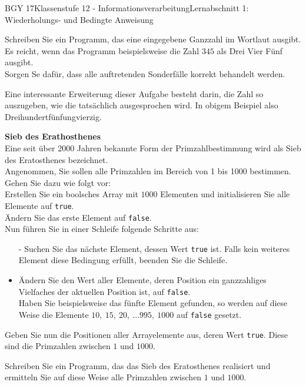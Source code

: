 \documentclass[oneside,openany,headings=optiontotoc,11pt,numbers=noenddot]{scrreprt}
\begin{document}
\begin{worksheet}{BGY 17}{Klassenstufe 12 - Informationsverarbeitung}{Lernabschnitt 1: Wiederholungs- und Bedingte Anweisung}
\begin{framed}
			Schreiben Sie ein Programm, das eine eingegebene Ganzzahl im Wortlaut ausgibt. Es reicht, wenn das Programm beispielsweise die Zahl \(345\) als \grq{}Drei Vier Fünf\grq{} ausgibt.\\
			Sorgen Se dafür, dass alle auftretenden Sonderfälle korrekt behandelt werden.\\
			\par\noindent
			Eine interessante Erweiterung dieser Aufgabe besteht darin, die Zahl so auszugeben, wie die tatsächlich ausgesprochen wird. In obigem Beispiel also \grqq{}Dreihundertfünfungvierzig\grqq{}.\\
			\par\noindent
			\textbf{Sieb des Erathosthenes}\\
			Eine seit über 2000 Jahren bekannte Form der Primzahlbestimmung wird als \grqq{}Sieb des Eratosthenes\grqq{} bezeichnet.\\
			Angenommen, Sie sollen alle Primzahlen im Bereich von 1 bis 1000 bestimmen. Gehen Sie dazu wie folgt vor:\\
			Erstellen Sie ein boolsches Array mit \(1000\) Elementen und initialisieren Sie alle Elemente auf \lstinline[style=JavaInputStyle]|true|.\\
			Ändern Sie das erste Element auf \lstinline[style=JavaInputStyle]|false|.\\
			Nun führen Sie in einer Schleife folgende Schritte aus:
			\begin{itemize}
				\item[-] Suchen Sie das nächste Element, dessen Wert \lstinline[style=JavaInputStyle]|true| ist. Falls kein weiteres Element diese Bedingung erfüllt, beenden Sie die Schleife.
				\item[-] Ändern Sie den Wert aller Elemente, deren Position ein ganzzahliges Vielfaches der aktuellen Position ist, auf \lstinline[style=JavaInputStyle]|false|.\\
				Haben Sie beispielsweise das fünfte Element gefunden, so werden auf diese Weise die Elemente \(10,\ 15,\ 20,\ \ldots{}995,\ 1000\) auf \lstinline[style=JavaInputStyle]|false| gesetzt.\\
			\end{itemize}
			Geben Sie nun die Positionen aller Arrayelemente aus, deren Wert \lstinline[style=JavaInputStyle]|true|. Diese sind die Primzahlen zwischen \(1\) und \(1000\).\\
			\par\noindent
			Schreiben Sie ein Programm, das das \grqq{}Sieb des Eratosthenes\grqq{} realisiert und ermitteln Sie auf diese Weise alle Primzahlen zwischen \(1\) und \(1000\).\\

\end{framed}
\end{worksheet}
\end{document}

